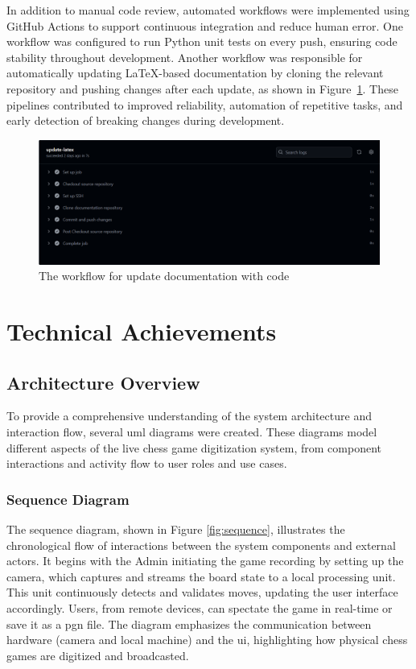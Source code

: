In addition to manual code review, automated workflows were implemented using GitHub Actions to support continuous integration and reduce human error. One workflow was configured to run Python unit tests on every push, ensuring code stability throughout development. Another workflow was responsible for automatically updating LaTeX-based documentation by cloning the relevant repository and pushing changes after each update, as shown in Figure~\ref{fig:workflow-latex}. These pipelines contributed to improved reliability, automation of repetitive tasks, and early detection of breaking changes during development. \\

\begin{figure}[h!] \centering 
\includegraphics[width=0.75\linewidth]{figures/results/workflows/latex.png}\caption[Upload LaTeX workflow]{The workflow for update documentation with code}\label{fig:workflow-latex} \end{figure}

\section{Technical Achievements}

\subsection{Architecture Overview}
\label{subsec:diagrams}

To provide a comprehensive understanding of the system architecture and interaction flow, several \gls{uml} diagrams were created. These diagrams model different aspects of the live chess game digitization system, from component interactions and activity flow to user roles and use cases.

\subsubsection*{Sequence Diagram}
\label{subsubsec:sequence-diagram}

The sequence diagram, shown in Figure \ref{fig:sequence}, illustrates the chronological flow of interactions between the system components and external actors. It begins with the Admin initiating the game recording by setting up the camera, which captures and streams the board state to a local processing unit. This unit continuously detects and validates moves, updating the user interface accordingly. Users, from remote devices, can spectate the game in real-time or save it as a \gls{pgn} file. The diagram emphasizes the communication between hardware (camera and local machine) and the \gls{ui}, highlighting how physical chess games are digitized and broadcasted.

